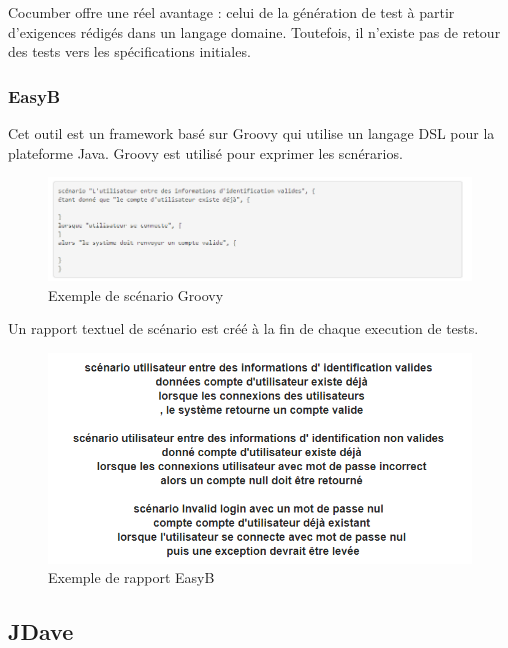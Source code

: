         Cocumber offre une réel avantage : celui de la génération de test à partir d'exigences rédigés dans un langage domaine. Toutefois, il n'existe pas de retour des tests vers les spécifications initiales.
        
        \subsubsection{EasyB}
        
        Cet outil est un framework basé sur Groovy qui utilise un langage DSL pour la plateforme Java. Groovy est utilisé pour exprimer les scnérarios.
            \begin{figure}[H]
                \centering
                \includegraphics[width=\textwidth]{images/easyB.PNG}
                \caption{Exemple de scénario Groovy}
            \end{figure}
        
        Un rapport textuel de scénario est créé à la fin de chaque execution de tests. 
            
            \begin{figure}[H]
                \centering
                \includegraphics[width=\textwidth]{images/rapportEasyB.PNG}
                \caption{Exemple de rapport EasyB}
            \end{figure}
        
        \subsection{JDave}
        
